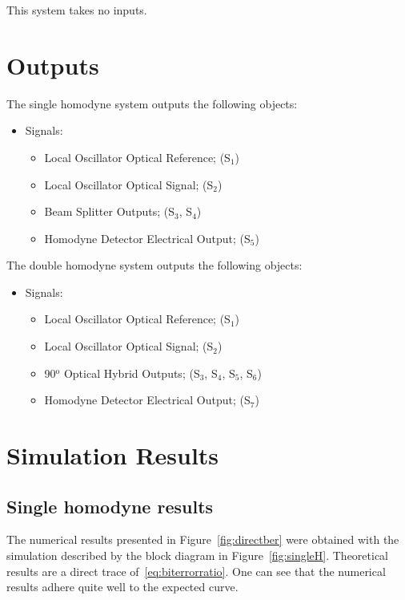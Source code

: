 \documentclass[a4paper]{article}
\begin{document}
This system takes no inputs.

\section{Outputs}

The single homodyne system outputs the following objects:
\begin{itemize}
\item Signals:
\begin{itemize}
\item Local Oscillator Optical Reference; (S$_{1}$)
\item Local Oscillator Optical Signal; (S$_{2}$)
\item Beam Splitter Outputs; (S$_{3}$, S$_{4}$)
\item Homodyne Detector Electrical Output; (S$_{5}$)
\end{itemize}
\end{itemize}
\par
The double homodyne system outputs the following objects:
\begin{itemize}
\item Signals:
\begin{itemize}
\item Local Oscillator Optical Reference; (S$_{1}$)
\item Local Oscillator Optical Signal; (S$_{2}$)
\item 90$^\text{o}$ Optical Hybrid Outputs; (S$_{3}$, S$_{4}$, S$_{5}$, S$_{6}$)
\item Homodyne Detector Electrical Output; (S$_{7}$)
\end{itemize}
\end{itemize}		

\section{Simulation Results}
\subsection{Single homodyne results}\label{subsec:SHresults}

The numerical results presented in Figure~\ref{fig:directber} were obtained with the simulation described by the block diagram in Figure~\ref{fig:singleH}. Theoretical results are a direct trace of~\eqref{eq:biterrorratio}. One can see that the numerical results adhere quite well to the expected curve.
\end{document}
